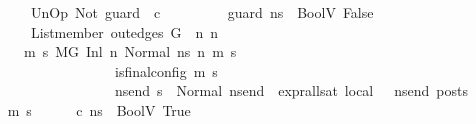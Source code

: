 \begin{isabellebody}
\ \ \ \ \ \ \ {\isachardoublequoteopen}UnOp\ Not\ guard\ {\isasymsim}\ c{\isachardoublequoteclose}\isanewline
\ \ \ \ \ \ \ {\isachardoublequoteopen}{\isasymLambda}{\isacharcomma}{\kern0pt}{\isasymGamma}{\isacharcomma}{\kern0pt}{\isasymOmega}\ {\isasymturnstile}\ {\isasymlangle}guard{\isacharcomma}{\kern0pt}\ ns{}{\isasymrangle}\ {\isasymDown}\ BoolV\ False{\isachardoublequoteclose}\isanewline
\ \ \ \ \ \ \ {\isachardoublequoteopen}List{\isachardot}{\kern0pt}member\ {\isacharparenleft}{\kern0pt}out{\isacharunderscore}{\kern0pt}edges\ G\ {\isacharbang}{\kern0pt}\ n{}{\isacharparenright}{\kern0pt}\ n{}{\isachardoublequoteclose}\isanewline
\ \ \ \ \ {\isachardoublequoteopen}{\isasymAnd}\ m\ s{\isachardot}{\kern0pt}\ {\isacharparenleft}{\kern0pt}M{\isacharcomma}{\kern0pt}{\isasymLambda}{\isacharcomma}{\kern0pt}{\isasymGamma}{\isacharcomma}{\kern0pt}{\isasymOmega}{\isacharcomma}{\kern0pt}G\ {\isasymturnstile}{\isacharparenleft}{\kern0pt}Inl\ n{}{\isacharcomma}{\kern0pt}\ Normal\ ns{}{\isacharparenright}{\kern0pt}\ {\isacharminus}{\kern0pt}n{\isasymrightarrow}{\isacharasterisk}{\kern0pt}\ {\isacharparenleft}{\kern0pt}m{\isacharcomma}{\kern0pt}\ s{\isacharparenright}{\kern0pt}{\isacharparenright}{\kern0pt}\ {\isasymLongrightarrow}\ \isanewline
\ \ \ \ \ \ \ \ \ \ \ \ \ \ \ \ \ \ \ {\isacharparenleft}{\kern0pt}is{\isacharunderscore}{\kern0pt}final{\isacharunderscore}{\kern0pt}config\ {\isacharparenleft}{\kern0pt}m{\isacharcomma}{\kern0pt}\ s{\isacharparenright}{\kern0pt}\ {\isasymLongrightarrow}\ \isanewline
\ \ \ \ \ \ \ \ \ \ \ \ \ \ \ \ \ \ \ {\isacharparenleft}{\kern0pt}{\isasymforall}ns{\isacharunderscore}{\kern0pt}end{\isachardot}{\kern0pt}\ s\ {\isacharequal}{\kern0pt}\ Normal\ ns{\isacharunderscore}{\kern0pt}end\ {\isasymlongrightarrow}\ {\isacharparenleft}{\kern0pt}expr{\isacharunderscore}{\kern0pt}all{\isacharunderscore}{\kern0pt}sat\ {\isasymLambda}{}{\isacharunderscore}{\kern0pt}local\ {\isasymGamma}\ {\isasymOmega}\ ns{\isacharunderscore}{\kern0pt}end{\isacharparenright}{\kern0pt}\ posts{\isacharparenright}{\kern0pt}{\isacharparenright}{\kern0pt}{\isachardoublequoteclose}\isanewline
%
\isadelimproof
%
\endisadelimproof
%
\isatagproof
{}\isamarkupfalse%
\ {\isacharminus}{\kern0pt}\isanewline
\ \ \isamarkupfalse%
\ m{}\ s{}\isanewline
\ \ \isamarkupfalse%
\ {\isachardoublequoteopen}{\isasymLambda}{\isacharcomma}{\kern0pt}{\isasymGamma}{\isacharcomma}{\kern0pt}{\isasymOmega}\ {\isasymturnstile}\ {\isasymlangle}c{\isacharcomma}{\kern0pt}\ ns{}{\isasymrangle}\ {\isasymDown}\ BoolV\ True{\isachardoublequoteclose}\ \isamarkupfalse%

\end{isabellebody}
